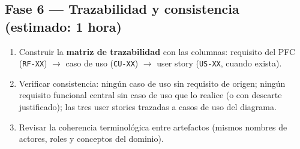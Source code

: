 \documentclass[11pt]{article}
\begin{document}
\subsection*{\textcolor{midblue}{Fase 6 --- Trazabilidad y consistencia (estimado: 1 hora)}}
\begin{enumerate}[leftmargin=18pt,itemsep=2pt]
  \item Construir la \textbf{matriz de trazabilidad} con las columnas: requisito del PFC (\texttt{RF-XX}) $\rightarrow$ caso de uso (\texttt{CU-XX}) $\rightarrow$ user story (\texttt{US-XX}, cuando exista).
  \item Verificar consistencia: ningún caso de uso sin requisito de origen; ningún requisito funcional central sin caso de uso que lo realice (o con descarte justificado); las tres user stories trazadas a casos de uso del diagrama.
  \item Revisar la coherencia terminológica entre artefactos (mismos nombres de actores, roles y conceptos del dominio).
\end{enumerate}
\end{document}
